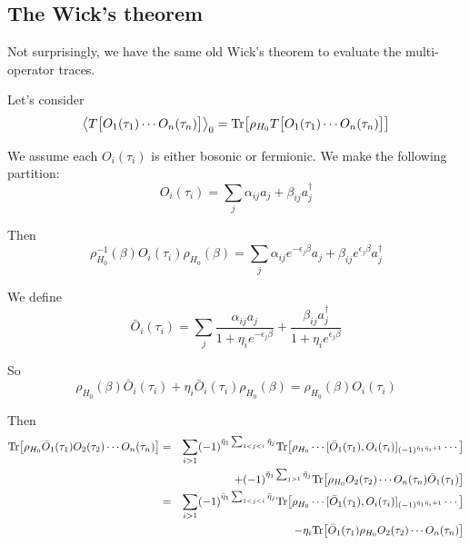 \documentclass[12pt]{book}
\begin{document}
	\subsection{The Wick's theorem}
	
	Not surprisingly, we have the same old Wick's theorem to evaluate the multi-operator traces.
	
	Let's consider 
	\begin{equation}
		\big\langle T\big[O_1(\tau_1)\cdots O_n(\tau_n)\big]\big\rangle_0={\rm Tr}\big[\rho_{H_0}T\big[O_1(\tau_1)\cdots O_n(\tau_n)\big]\big]
	\end{equation}
	
	We assume each $O_i(\tau_i)$ is either bosonic or fermionic. We make the following partition:
	\begin{equation}
		O_i(\tau_i)=\sum_j \alpha_{ij} a_j+\beta_{ij} a_j^\dagger
	\end{equation}
	
	Then
	\begin{equation}
		\rho^{-1}_{H_0}(\beta)O_i(\tau_i)\rho_{H_0}(\beta)=\sum_j \alpha_{ij}e^{-\epsilon_j\beta} a_j+\beta_{ij}e^{\epsilon_j\beta} a_j^\dagger
	\end{equation}
	
	We define 
	\begin{equation}
		\bar O_i(\tau_i)=\sum_j\frac{\alpha_{ij}a_j}{1+\eta_ie^{-\epsilon_j\beta}}+\frac{\beta_{ij}a_j^\dagger}{1+\eta_ie^{\epsilon_j\beta}}
	\end{equation}
	
	So
	\begin{equation}
		\rho_{H_0}(\beta)\bar O_i(\tau_i)+\eta_i\bar O_i(\tau_i)\rho_{H_0}(\beta)=\rho_{H_0}(\beta)O_i(\tau_i)
	\end{equation}
	
	Then
	\begin{eqnarray}
		{\rm Tr}\big[\rho_{H_0}\bar O_1(\tau_1)O_2(\tau_2)\cdots O_n(\tau_n)\big]&=&\sum_{i>1}(-1)^{\bar\eta_1\sum_{1<j<i}\bar\eta_j}{\rm Tr}\big[\rho_{H_0}\cdots[\bar O_1(\tau_1), O_i(\tau_i)]_{(-1)^{\bar\eta_1\bar\eta_i+1}}\cdots\big]\nonumber\\
		&&+(-1)^{\bar\eta_1\sum_{j>1}\bar\eta_j}{\rm Tr}\big[\rho_{H_0}O_2(\tau_2)\cdots O_n(\tau_n)\bar O_1(\tau_1)\big]\\
		&=&\sum_{i>1}(-1)^{\bar\eta_1\sum_{1<j<i}\bar\eta_j}{\rm Tr}\big[\rho_{H_0}\cdots[\bar O_1(\tau_1), O_i(\tau_i)]_{(-1)^{\bar\eta_1\bar\eta_i+1}}\cdots\big]\nonumber\\
		&&-\eta_i{\rm Tr}\big[\bar O_1(\tau_1)\rho_{H_0}O_2(\tau_2)\cdots O_n(\tau_n)\big]
	\end{eqnarray}
	
\end{document}
